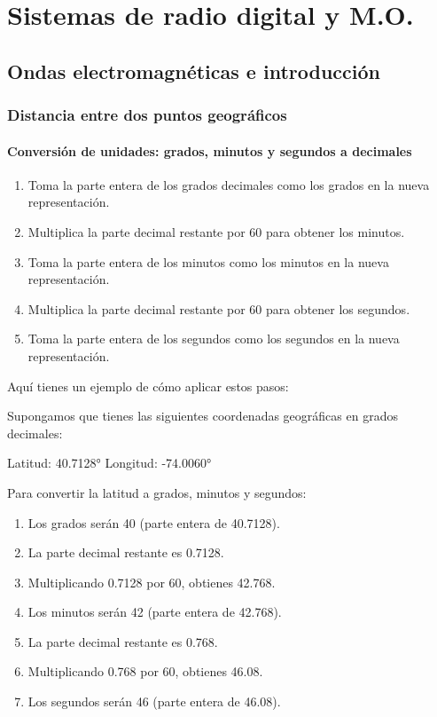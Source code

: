 \documentclass[
	12pt, %
	fleqn, %
	a4paper, %
	oneside, %
]{LegrandOrangeBook}
\begin{document}
\part{Sistemas de radio digital y M.O.}
\chapter{Ondas electromagnéticas e introducción}
\section*{Distancia entre dos puntos geográficos}
\subsection*{Conversión de unidades: grados, minutos y segundos a decimales}
\begin{enumerate}
\item Toma la parte entera de los grados decimales como los grados en la nueva representación.
\item Multiplica la parte decimal restante por 60 para obtener los minutos.
\item Toma la parte entera de los minutos como los minutos en la nueva representación.
\item Multiplica la parte decimal restante por 60 para obtener los segundos.
\item Toma la parte entera de los segundos como los segundos en la nueva representación.
\end{enumerate}

Aquí tienes un ejemplo de cómo aplicar estos pasos:

Supongamos que tienes las siguientes coordenadas geográficas en grados decimales:

Latitud: 40.7128°
Longitud: -74.0060°

Para convertir la latitud a grados, minutos y segundos:

\begin{enumerate}
\item Los grados serán 40 (parte entera de 40.7128).
\item La parte decimal restante es 0.7128.
\item Multiplicando 0.7128 por 60, obtienes 42.768.
\item Los minutos serán 42 (parte entera de 42.768).
\item La parte decimal restante es 0.768.
\item Multiplicando 0.768 por 60, obtienes 46.08.
\item Los segundos serán 46 (parte entera de 46.08).
\end{enumerate}
\end{document}
